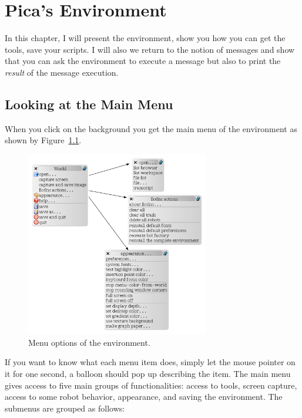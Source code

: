 
\ifx\wholebook\relax\else



\fi

\chapter{Pica's Environment}\label{cha:caroTour}

In this chapter, I will present the environment, show you how you can get the tools, save your scripts. I will also we return to the notion of messages and show that you can ask the environment to execute a message but also to print the \emph{result} of the message execution. 


\section{Looking at the Main Menu}
When you click on the background you get the main menu of the environment as shown by Figure~\ref{fig:allMenu}. 


\begin{figure}[h]
\begin{center}
\includegraphics[width=8cm]{allMenu}
\caption{Menu options of the environment.\label{fig:allMenu}}
\end{center}
\end{figure}

If you want to know what each menu item does, simply let the mouse pointer on it for one second, a balloon should pop up describing the item. The main menu gives access to five main groups of functionalities: access to tools, screen capture, access to some robot behavior, appearance,  and saving the environment. The submenus are grouped as follows: 

